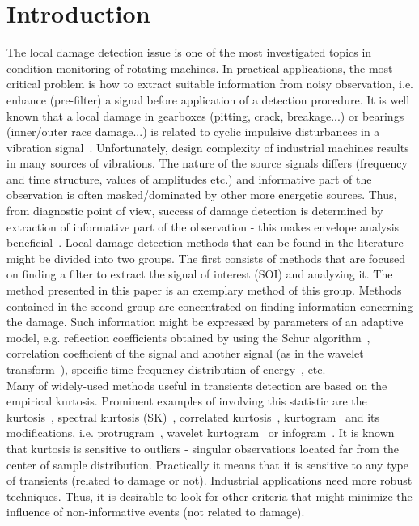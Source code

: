 \documentclass[11pt]{article} %
\begin{document}
\section{Introduction}
The local damage  detection  issue is  one  of  the  most  investigated  topics  in  condition  monitoring  of rotating machines. In practical  applications, the  most critical problem  is  how  to  extract suitable  information  from  noisy observation, i.e. enhance (pre-filter) a signal before application of a detection procedure. It is well known that a local damage in gearboxes (pitting, crack, breakage...) or bearings (inner/outer race damage...) is related to cyclic impulsive disturbances in a vibration signal~\cite{Kia2015}.  Unfortunately,  design complexity of industrial  machines   results in  many  sources  of  vibrations. The nature of the source signals differs (frequency and time structure, values of amplitudes etc.) and informative part of the observation is often masked/dominated  by  other  more  energetic  sources. Thus, from  diagnostic    point  of  view,  success  of  damage detection is determined by extraction of informative part of the observation - this makes envelope analysis beneficial~\cite{EnvelopeNoiseGPU}. Local damage detection methods that can be found in the literature might be divided into two groups. The first consists of methods that are focused on finding a filter to extract the signal of interest (SOI) and analyzing it. The method presented in this paper is an exemplary method of this group. Methods contained in the second group are concentrated on finding information concerning the damage. Such information might be expressed by parameters of an adaptive model, e.g. reflection coefficients obtained by using the Schur algorithm~\cite{Schur}, correlation coefficient of the signal and another signal (as in the wavelet transform~\cite{Wavelets}), specific time-frequency distribution of energy~\cite{LocalMaxima,BurdzikSHM,ZakMS}, etc.\\
Many of widely-used methods useful in transients detection are  based on the empirical kurtosis. Prominent examples of involving this statistic are the kurtosis~\cite{Leite,Prieto},  spectral kurtosis (SK)~\cite{CombetSK,Antoni2SK,Immovilli,Liu,Fournier}, correlated kurtosis~\cite{CorrKurtosisJVE}, kurtogram~\cite{AntoniKurtogram} and its modifications, i.e. protrugram~\cite{Protrugram}, wavelet kurtogram~\cite{Wavelet_kurtogram} or infogram~\cite{Infogram}. It is known that kurtosis is sensitive to outliers - singular observations located far from the center of sample distribution. Practically it means that it is sensitive to any type of transients (related to damage or not). Industrial applications need more robust techniques. Thus, it is desirable to look for other criteria that might minimize the influence of non-informative events (not related to damage).\\
\end{document}
